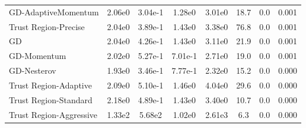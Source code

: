 \documentclass{article}
\begin{document}
\begin{table}[htbp]
{\begin{tabular}{p{2.5cm}*{7}{c}}
GD-AdaptiveMomentum & 2.06e0 & 3.04e-1 & 1.28e0 & 3.01e0 & 18.7 & 0.0 & 0.001 \\
Trust Region-Precise & 2.04e0 & 3.89e-1 & 1.43e0 & 3.38e0 & 76.8 & 0.0 & 0.001 \\
GD & 2.04e0 & 4.26e-1 & 1.43e0 & 3.11e0 & 21.9 & 0.0 & 0.001 \\
GD-Momentum & 2.02e0 & 5.27e-1 & 7.01e-1 & 2.71e0 & 19.0 & 0.0 & 0.001 \\
GD-Nesterov & 1.93e0 & 3.46e-1 & 7.77e-1 & 2.32e0 & 15.2 & 0.0 & 0.000 \\
Trust Region-Adaptive & 2.09e0 & 5.10e-1 & 1.46e0 & 4.04e0 & 29.6 & 0.0 & 0.000 \\
Trust Region-Standard & 2.18e0 & 4.89e-1 & 1.43e0 & 3.40e0 & 10.7 & 0.0 & 0.000 \\
Trust Region-Aggressive & 1.33e2 & 5.68e2 & 1.02e0 & 2.61e3 & 6.3 & 0.0 & 0.000 \\
\bottomrule
\end{tabular}
}
\end{table}
\end{document}
